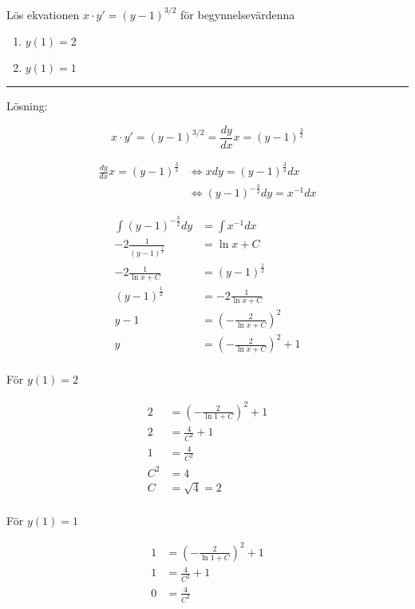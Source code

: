 \documentclass[11pt]{article}
\begin{document}
Lös ekvationen $x \cdot y' = (y - 1)^{3/2}$ för begynnelsevärdenna

\begin{enumerate}[label=\roman*.]
    \item $y(1) = 2$
    \item $y(1) = 1$
\end{enumerate}

\noindent\rule{\textwidth}{0.5pt}

Lösning:

\begin{equation}
    x \cdot y' = (y - 1)^{3/2} = \frac{dy}{dx}x = (y - 1)^{\frac{3}{2}}
\end{equation}

\begin{align}
    \frac{dy}{dx}x = (y - 1)^{\frac{3}{2}} &\Leftrightarrow xdy = (y - 1)^{\frac{3}{2}}dx \\
    &\Leftrightarrow (y - 1)^{-\frac{3}{2}}dy = x^{-1}dx
\end{align}

\begin{align}
    \int (y - 1)^{-\frac{3}{2}}dy &= \int x^{-1}dx \\
    -2\frac{1}{(y - 1)^{\frac{1}{2}}} &= \ln x + C \\
    -2\frac{1}{\ln x + C} &= (y - 1)^{\frac{1}{2}} \\
    (y - 1)^{\frac{1}{2}} &= -2\frac{1}{\ln x + C}\\
    y - 1 &= \left(-\frac{2}{\ln x + C}\right)^2\\
    y &= \left(-\frac{2}{\ln x + C}\right)^2 + 1\\
\end{align}

För $y(1) = 2$

\begin{align}
    2 &= \left(-\frac{2}{\ln 1 + C}\right)^2 + 1\\
    2 &= \frac{4}{C^2} + 1\\
    1 &= \frac{4}{C^2} \\
    C^2 &= 4 \\
    C &= \sqrt{4} = 2 \\
\end{align}

För $y(1) = 1$

\begin{align}
    1 &= \left(-\frac{2}{\ln 1 + C}\right)^2 + 1\\
    1 &= \frac{4}{C^2} + 1\\
    0 &= \frac{4}{C^2} \\
\end{align}
\end{document}
